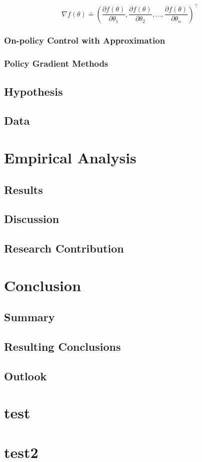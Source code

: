 \documentclass{seal_thesis}
\begin{document}
\begin{equation}
	\nabla f(\theta) \doteq \left( \frac{\partial f(\theta)}{\partial \theta_1}, \frac{\partial f(\theta)}{\partial \theta_2}, \ldots, \frac{\partial f(\theta)}{\partial \theta_n} \right)^\top
\end{equation}


\subsection{On-policy Control with Approximation}

\subsection{Policy Gradient Methods}

\section{Hypothesis}
\section{Data}

\chapter{Empirical Analysis}
\label{ch:empirical_analysis}



\section{Results}
\section{Discussion}
\section{Research Contribution}

\chapter{Conclusion}
\label{ch:conclusion}

\section{Summary}
\section{Resulting Conclusions}
\section{Outlook}

\appendix

\chapter{test}
\chapter{test2}

\backmatter




\end{document}
